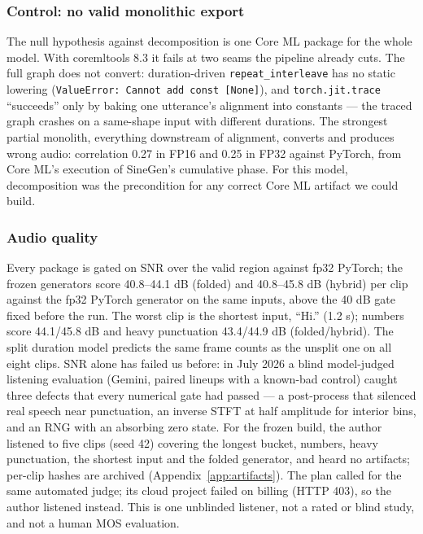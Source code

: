 \documentclass[11pt]{article}
\newcommand{\code}[1]{\texttt{#1}}
\begin{document}
\subsubsection{Control: no valid monolithic export}\label{sec:cs1-monolith}

The null hypothesis against decomposition is one Core ML package for the whole model. With coremltools 8.3 it fails at two seams the pipeline already cuts. The full graph does not convert: duration-driven \code{repeat\_interleave} has no static lowering (\code{ValueError: Cannot add const [None]}), and \code{torch.jit.trace} ``succeeds'' only by baking one utterance's alignment into constants --- the traced graph crashes on a same-shape input with different durations. The strongest partial monolith, everything downstream of alignment, converts and produces wrong audio: correlation 0.27 in FP16 and 0.25 in FP32 against PyTorch, from Core ML's execution of SineGen's cumulative phase. For this model, decomposition was the precondition for any correct Core ML artifact we could build.

\subsubsection{Audio quality}\label{sec:cs1-quality}

Every package is gated on SNR over the valid region against fp32 PyTorch; the frozen generators score 40.8--44.1 dB (folded) and 40.8--45.8 dB (hybrid) per clip against the fp32 PyTorch generator on the same inputs, above the 40 dB gate fixed before the run. The worst clip is the shortest input, ``Hi.'' (1.2 s); numbers score 44.1/45.8 dB and heavy punctuation 43.4/44.9 dB (folded/hybrid). The split duration model predicts the same frame counts as the unsplit one on all eight clips. SNR alone has failed us before: in July 2026 a blind model-judged listening evaluation (Gemini, paired lineups with a known-bad control) caught three defects that every numerical gate had passed --- a post-process that silenced real speech near punctuation, an inverse STFT at half amplitude for interior bins, and an RNG with an absorbing zero state. For the frozen build, the author listened to five clips (seed 42) covering the longest bucket, numbers, heavy punctuation, the shortest input and the folded generator, and heard no artifacts; per-clip hashes are archived (Appendix~\ref{app:artifacts}). The plan called for the same automated judge; its cloud project failed on billing (HTTP 403), so the author listened instead. This is one unblinded listener, not a rated or blind study, and not a human MOS evaluation.
\end{document}
